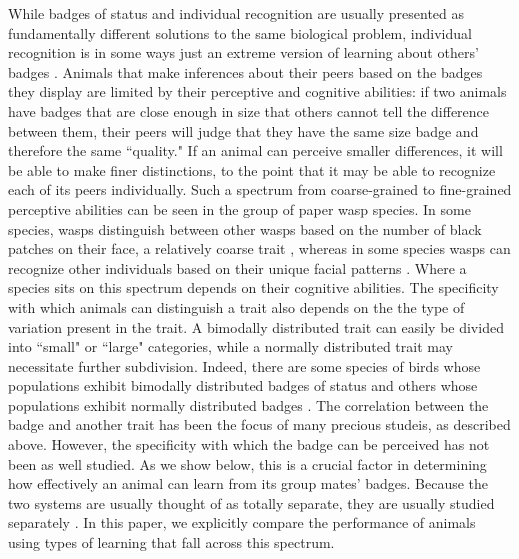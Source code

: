 While badges of status and individual recognition are usually presented as fundamentally different solutions to the same biological problem, individual recognition is in some ways just an extreme version of learning about others' badges \citep{Barnard:1979fk}. Animals that make inferences about their peers based on the badges they display are limited by their perceptive and cognitive abilities: if two animals have badges that are close enough in size that others cannot tell the difference between them, their peers will judge that they have the same size badge and therefore the same ``quality." If an animal can perceive smaller differences, it will be able to make finer distinctions, to the point that it may be able to recognize each of its peers individually.  Such a spectrum from coarse-grained to fine-grained perceptive abilities can be seen in the group of paper wasp species. In some species, wasps distinguish between other wasps based on the number of black patches on their face, a relatively coarse trait \citep{Tibbetts:2004kx}, whereas in some species wasps can recognize other individuals based on their unique facial patterns \citep{Tibbetts:2002ys}. Where a species sits on this spectrum depends on their cognitive abilities. The specificity with which animals can distinguish a trait also depends on the the type of variation present in the trait. A bimodally distributed trait can easily be divided into ``small" or ``large" categories, while a normally distributed trait may necessitate further subdivision. Indeed, there are some species of birds whose populations exhibit bimodally distributed badges of status and others whose populations exhibit normally distributed badges \citep{Ripoll:2004vn}.
The correlation between the badge and another trait has been the focus of many precious studeis, as described above. However, the specificity with which the badge can be perceived has not been as well studied. As we show below, this is a crucial factor in determining how effectively an animal can learn from its group mates' badges. Because the two systems are usually thought of as totally separate, they are usually studied separately \citep{sheehan2016evotradeoff}. In this paper, we explicitly compare the performance of animals using types of learning that fall across this spectrum.


